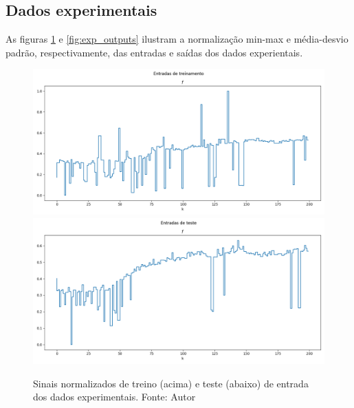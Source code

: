 \subsection{Dados experimentais}
As figuras \ref{fig:exp_inputs} e \ref{fig:exp_outputs} ilustram a normalização min-max e média-desvio padrão, respectivamente, das entradas e saídas dos dados experientais.

\begin{figure}[hbt!]
    \centering
    \includegraphics[width=0.8\linewidth]{Imagens/chap04/experiment_inputs_train.png}
    \hfill
    \includegraphics[width=0.8\linewidth]{Imagens/chap04/experiment_inputs_test.png}
    \caption{Sinais normalizados de treino (acima) e teste (abaixo) de entrada dos dados experimentais. Fonte: Autor}
    \label{fig:exp_inputs}
\end{figure}

